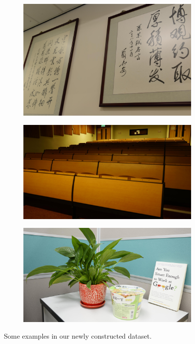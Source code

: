 \begin{figure}
\begin{subfigure}[t]{0.4\textwidth}
        \includegraphics[width=1\textwidth]{images/dataset/NikonD800_8_125_6400_photo_mean.JPG}
    \end{subfigure}
    \hfill
    \begin{subfigure}[t]{0.4\textwidth}
        \centering
        \includegraphics[width=1\textwidth]{images/dataset/Sony_3-5_200_1600_classroom_mean.JPG}
    \end{subfigure}
    \hfill
    \begin{subfigure}[t]{0.4\textwidth}
        \centering
        \includegraphics[width=1\textwidth]{images/dataset/Sony_4-5_125_3200_plant_mean.JPG}
    \end{subfigure}
    \caption{Some examples in our newly constructed dataset.}
    \label{fig6-2}
\end{figure}

